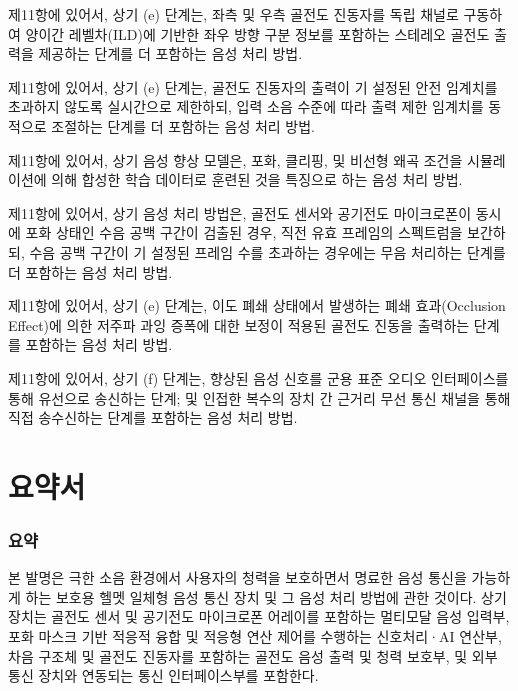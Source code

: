 \documentclass{article}
\begin{document}
\begin{enumerate}[label=\textbf{[\arabic*]}]
    \item 제11항에 있어서,
    상기 (e) 단계는, 좌측 및 우측 골전도 진동자를 독립 채널로 구동하여 양이간 레벨차(ILD)에 기반한 좌우 방향 구분 정보를 포함하는 스테레오 골전도 출력을 제공하는 단계를 더 포함하는 음성 처리 방법.

    \item 제11항에 있어서,
    상기 (e) 단계는, 골전도 진동자의 출력이 기 설정된 안전 임계치를 초과하지 않도록 실시간으로 제한하되, 입력 소음 수준에 따라 출력 제한 임계치를 동적으로 조절하는 단계를 더 포함하는 음성 처리 방법.

    \item 제11항에 있어서,
    상기 음성 향상 모델은, 포화, 클리핑, 및 비선형 왜곡 조건을 시뮬레이션에 의해 합성한 학습 데이터로 훈련된 것을 특징으로 하는 음성 처리 방법.

    \item 제11항에 있어서,
    상기 음성 처리 방법은, 골전도 센서와 공기전도 마이크로폰이 동시에 포화 상태인 수음 공백 구간이 검출된 경우, 직전 유효 프레임의 스펙트럼을 보간하되, 수음 공백 구간이 기 설정된 프레임 수를 초과하는 경우에는 무음 처리하는 단계를 더 포함하는 음성 처리 방법.

    \item 제11항에 있어서,
    상기 (e) 단계는, 이도 폐쇄 상태에서 발생하는 폐쇄 효과(Occlusion Effect)에 의한 저주파 과잉 증폭에 대한 보정이 적용된 골전도 진동을 출력하는 단계를 포함하는 음성 처리 방법.

    \item 제11항에 있어서,
    상기 (f) 단계는, 향상된 음성 신호를 군용 표준 오디오 인터페이스를 통해 유선으로 송신하는 단계; 및 인접한 복수의 장치 간 근거리 무선 통신 채널을 통해 직접 송수신하는 단계를 포함하는 음성 처리 방법.

\end{enumerate}


\part{요약서}

\section{요약}

본 발명은 극한 소음 환경에서 사용자의 청력을 보호하면서 명료한 음성 통신을 가능하게 하는 보호용 헬멧 일체형 음성 통신 장치 및 그 음성 처리 방법에 관한 것이다. 상기 장치는 골전도 센서 및 공기전도 마이크로폰 어레이를 포함하는 멀티모달 음성 입력부, 포화 마스크 기반 적응적 융합 및 적응형 연산 제어를 수행하는 신호처리·AI 연산부, 차음 구조체 및 골전도 진동자를 포함하는 골전도 음성 출력 및 청력 보호부, 및 외부 통신 장치와 연동되는 통신 인터페이스부를 포함한다.
\end{document}
